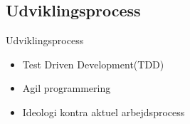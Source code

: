 \subsection{Udviklingsprocess}
\begin{frame}{Udviklingsprocess}
  \begin{itemize}
    \item Test Driven Development(TDD)
    \item Agil programmering
    \item Ideologi kontra aktuel arbejdsprocess
  \end{itemize}
\end{frame}